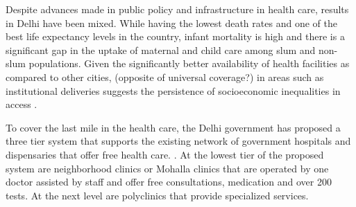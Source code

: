 Despite advances made in public policy and infrastructure in health care, results in Delhi have been mixed. While having the lowest death rates and one of the best life expectancy levels in the country, infant mortality is high and there is a significant gap in the uptake of maternal and child care among slum and non-slum populations. Given the significantly better availability of health facilities as compared to other cities, (opposite of universal coverage?) in areas such as institutional deliveries suggests the persistence of socioeconomic inequalities in access \cite{mazumdar2015health}.

To cover the last mile in the health care, the Delhi government has proposed a three tier system that supports the existing network of government hospitals and dispensaries that offer free health care. \cite{article}. At the lowest tier of the proposed system are neighborhood clinics or Mohalla clinics that are operated by one doctor assisted by staff and offer free consultations, medication and over 200 tests. At the next level are polyclinics that provide specialized services. 






